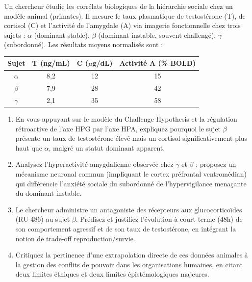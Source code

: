 \documentclass[11pt]{article}
\begin{document}
\begin{exercice}
Un chercheur étudie les corrélats biologiques de la hiérarchie sociale chez un modèle animal (primates). Il mesure le taux plasmatique de testostérone (T), de cortisol (C) et l'activité de l'amygdale (A) via imagerie fonctionnelle chez trois sujets : $\alpha$ (dominant stable), $\beta$ (dominant instable, souvent challengé), $\gamma$ (subordonné). Les résultats moyens normalisés sont :

\begin{center}
\begin{tabular}{|c|c|c|c|}
\hline
Sujet & T (ng/mL) & C ($\mu$g/dL) & Activité A (\% BOLD) \\
\hline
$\alpha$ & 8,2 & 12 & 15 \\
$\beta$ & 7,9 & 28 & 42 \\
$\gamma$ & 2,1 & 35 & 58 \\
\hline
\end{tabular}
\end{center}

\begin{enumerate}
\item En vous appuyant sur le modèle du \og Challenge Hypothesis \fg et la régulation rétroactive de l'axe HPG par l'axe HPA, expliquez pourquoi le sujet $\beta$ présente un taux de testostérone élevé mais un cortisol significativement plus haut que $\alpha$, malgré un statut dominant apparent.
\item Analysez l'hyperactivité amygdalienne observée chez $\gamma$ et $\beta$ : proposez un mécanisme neuronal commun (impliquant le cortex préfrontal ventromédian) qui différencie l'anxiété sociale du subordonné de l'hypervigilance menaçante du dominant instable.
\item Le chercheur administre un antagoniste des récepteurs aux glucocorticoïdes (RU-486) au sujet $\beta$. Prédisez et justifiez l'évolution à court terme (48h) de son comportement agressif et de son taux de testostérone, en intégrant la notion de \og trade-off \fg reproduction/survie.
\item Critiquez la pertinence d'une extrapolation directe de ces données animales à la gestion des conflits de pouvoir dans les organisations humaines, en citant deux limites éthiques et deux limites épistémologiques majeures.
\end{enumerate}
\end{exercice}
\end{document}
